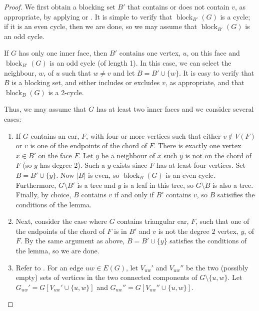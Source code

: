 \documentclass{patmorin}
\DeclareMathOperator{\block}{block}
\begin{document}
\begin{proof}
  We first obtain a blocking set $B'$ that contains or does not
  contain $v$, as appropriate, by applying  or
  . It is simple to verify that $\block_{B'}(G)$
  is a cycle;  if it is an even cycle, then we are done, so we may assume
  that $\block_{B'}(G)$ is an odd cycle.

  If $G$ has only one inner face, then $B'$ contains one vertex,
  $u$, on this face and $\block_{B'}(G)$ is an odd cycle (of length 1).
  In this case, we can select the neighbour, $w$, of $u$ such that
  $w\neq v$ and let $B=B'\cup\{w\}$.  It is easy to verify that $B$ is
  a blocking set, and either includes or excludes $v$, as appropriate,
  and that $\block_B(G)$ is a 2-cycle.

  Thus, we may assume that $G$ has at least two inner faces and we
  consider several cases:
 
  \begin{enumerate}
  \item If $G$ contains an ear, $F$, with four or more vertices such
  that either $v\not\in V(F)$ or $v$ is one of the endpoints of the
  chord of $F$. There is exactly one vertex $x\in B'$ on the face $F$.
  Let $y$ be a neighbour of $x$ such $y$ is not on the chord of $F$
  (so $y$ has degree 2). Such a $y$ exists since $F$ has at least four
  vertices.  Set $B=B'\cup \{y\}$.  Now $|B|$ is even, so $\block_B(G)$
  is an even cycle.  Furthermore, $G\setminus B'$ is a tree and $y$
  is a leaf in this tree, so $G\setminus B$ is also a tree.  Finally,
  by choice, $B$ contains $v$ if and only if $B'$ contains $v$, so $B$
  satisifies the conditions of the lemma.

  \item Next, consider the case where $G$ contains triangular ear, $F$,
  such that one of the endpoints of the chord of $F$ is in $B'$ and $v$
  is not the degree 2 vertex, $y$, of $F$.  By the same argument as above,
  $B=B'\cup\{y\}$ satisfies the conditions of the lemma, so we are done.

  \item Refer to . 
  For an edge $uw\in E(G)$, let $V_{uw}'$ and $V_{uw}''$ be the two
  (possibly empty) sets of vertices in the two connected components
  of $G\setminus\{u,w\}$.  Let $G_{uw}'=G[V_{uw}'\cup\{u,w\}]$ and
  $G_{uw}''=G[V_{uw}''\cup\{u,w\}]$.


\end{enumerate}
\end{proof}
\end{document}
